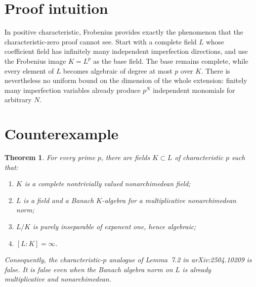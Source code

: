 \documentclass[11pt]{article}
\newtheorem{theorem}{Theorem}
\begin{document}
\section{Proof intuition}

In positive characteristic, Frobenius provides exactly the phenomenon that
the characteristic-zero proof cannot see.  Start with a complete field $L$
whose coefficient field has infinitely many independent imperfection
directions, and use the Frobenius image $K=L^p$ as the base field.  The base
remains complete, while every element of $L$ becomes algebraic of degree at
most $p$ over $K$.  There is nevertheless no uniform bound on the dimension
of the whole extension: finitely many imperfection variables already produce
$p^N$ independent monomials for arbitrary $N$.

\section{Counterexample}

\begin{theorem}\label{thm:counterexample}
For every prime $p$, there are fields $K\subset L$ of characteristic $p$ such
that:
\begin{enumerate}
  \item $K$ is a complete nontrivially valued nonarchimedean field;
  \item $L$ is a field and a Banach $K$-algebra for a multiplicative
        nonarchimedean norm;
  \item $L/K$ is purely inseparable of exponent one, hence algebraic;
  \item $[L:K]=\infty$.
\end{enumerate}
Consequently, the characteristic-$p$ analogue of Lemma~7.2 in
arXiv:2504.10209 is false.  It is false even when the Banach algebra norm on
$L$ is already multiplicative and nonarchimedean.
\end{theorem}
\end{document}

